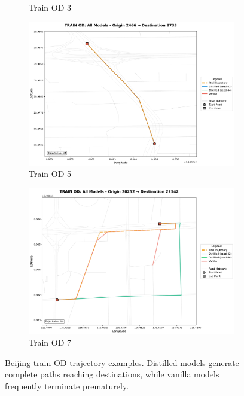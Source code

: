 \begin{figure}[H]
\begin{subfigure}{0.49\linewidth}
        \caption{Train OD 3}
    \end{subfigure}
    \begin{subfigure}{0.49\linewidth}
        \centering
        \includegraphics[width=\linewidth]{assets/plots/eval/beijing/trajectories/train_od_comparison_5_origin2466_dest8733.pdf}
        \caption{Train OD 5}
    \end{subfigure}
    \begin{subfigure}{0.49\linewidth}
        \centering
        \includegraphics[width=\linewidth]{assets/plots/eval/beijing/trajectories/train_od_comparison_7_origin20252_dest22542.pdf}
        \caption{Train OD 7}
    \end{subfigure}
    \caption{Beijing train OD trajectory examples. Distilled models generate complete paths reaching destinations, while vanilla models frequently terminate prematurely.}
    \label{fig:appendix-beijing-traj-train}
\end{figure}


